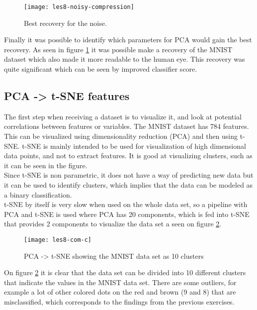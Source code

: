 \documentclass{article}
\begin{document}
\begin{figure}[H]
  \centering
    \texttt{[image: les8-noisy-compression]}
    \caption{Best recovery for the noise.}
    \label{fig:les8-noisy-compression}
\end{figure}

Finally it was possible to identify which parameters for PCA would gain the best recovery. As seen in figure \ref{fig:les8-noisy-compression} it was possible make a recovery of the MNIST dataset which also made it more readable to the human eye. This recovery was quite significant which can be seen by improved classifier score.

\subsection{PCA -> t-SNE features}
The first step when receiving a dataset is to visualize it, and look at potential correlations between features or variables. The MNIST dataset has 784 features. This can be visualized using dimensionality reduction (PCA) and then using t-SNE. t-SNE is mainly intended to be used for visualization of high dimensional data points, and not to extract features. It is good at visualizing clusters, such as it can be seen in the figure. 
\\
Since t-SNE is non parametric, it does not have a way of predicting new data but it can be used to identify clusters, which implies that the data can be modeled as a binary classification. 
\\
t-SNE by itself is very slow when used on the whole data set, so a pipeline with PCA and t-SNE is used  where PCA has 20 components, which is fed into t-SNE that provides 2 components to visualize the data set a seen on figure  \ref{fig:les8-com-c}.

\begin{figure}[H]
  \centering
    \texttt{[image: les8-com-c]}
    \caption{PCA -> t-SNE showing the MNIST data set as 10 clusters}
    \label{fig:les8-com-c}
\end{figure}

On figure \ref{fig:les8-com-c} it is clear that the data set can be divided into 10 different  clusters that indicate the values in the MNIST data set. There are some outliers, for example a lot of other colored dots on the red and brown (9 and 8) that are misclassified, which corresponds to the findings from the previous exercises.
\end{document}
